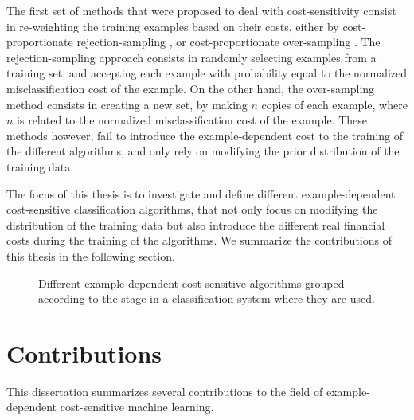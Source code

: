   The first set of methods that were proposed to deal with cost-sensitivity consist in 
  re-weighting the training examples based on their costs, either by cost-proportionate 
  rejection-sampling \citep{Zadrozny2003}, or cost-proportionate over-sampling \citep{Elkan2001}.
  The rejection-sampling approach consists in randomly selecting examples from a training set, and 
  accepting each example with probability equal to the normalized misclassification cost of the 
  example. On the other hand, the over-sampling method consists in creating a new set, by making 
  $n$ copies of each example, where $n$ is related to the normalized misclassification cost of the 
  example. These methods however, fail to introduce the example-dependent cost to the training of 
  the different algorithms, and only rely on modifying the prior distribution of the training data.

  The focus of this thesis is to investigate and define different example-dependent cost-sensitive
  classification algorithms, that not only focus on modifying the distribution of the training data
  but also introduce the different real financial costs during the training of the 
  algorithms. We summarize the contributions of this thesis in the following section.
  
  \begin{figure}
  \centering
  
  \caption{Different example-dependent cost-sensitive algorithms grouped according to the 
    stage in a classification system where they are used.}
  \label{fig:1:1}
  \end{figure}

\newpage
\section{Contributions}

This dissertation summarizes several contributions to the field of example-dependent 
cost-sensitive machine learning.
  
